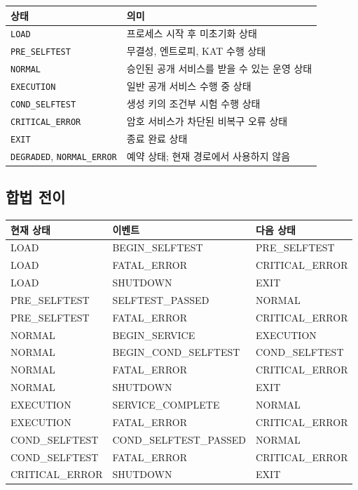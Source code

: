 \documentclass[11pt,a4paper]{article}
\begin{document}
\begin{longtable}{p{}p{}}
\toprule
상태 & 의미 \\
\midrule
\endhead
\texttt{LOAD} & 프로세스 시작 후 미초기화 상태 \\
\texttt{PRE\_SELFTEST} & 무결성, 엔트로피, KAT 수행 상태 \\
\texttt{NORMAL} & 승인된 공개 서비스를 받을 수 있는 운영 상태 \\
\texttt{EXECUTION} & 일반 공개 서비스 수행 중 상태 \\
\texttt{COND\_SELFTEST} & 생성 키의 조건부 시험 수행 상태 \\
\texttt{CRITICAL\_ERROR} & 암호 서비스가 차단된 비복구 오류 상태 \\
\texttt{EXIT} & 종료 완료 상태 \\
\texttt{DEGRADED}, \texttt{NORMAL\_ERROR} & 예약 상태; 현재 경로에서 사용하지 않음 \\
\bottomrule
\end{longtable}

\subsection{합법 전이}

\begin{longtable}{lll}
\toprule
현재 상태 & 이벤트 & 다음 상태 \\
\midrule
\endhead
LOAD & BEGIN\_SELFTEST & PRE\_SELFTEST \\
LOAD & FATAL\_ERROR & CRITICAL\_ERROR \\
LOAD & SHUTDOWN & EXIT \\
PRE\_SELFTEST & SELFTEST\_PASSED & NORMAL \\
PRE\_SELFTEST & FATAL\_ERROR & CRITICAL\_ERROR \\
NORMAL & BEGIN\_SERVICE & EXECUTION \\
NORMAL & BEGIN\_COND\_SELFTEST & COND\_SELFTEST \\
NORMAL & FATAL\_ERROR & CRITICAL\_ERROR \\
NORMAL & SHUTDOWN & EXIT \\
EXECUTION & SERVICE\_COMPLETE & NORMAL \\
EXECUTION & FATAL\_ERROR & CRITICAL\_ERROR \\
COND\_SELFTEST & COND\_SELFTEST\_PASSED & NORMAL \\
COND\_SELFTEST & FATAL\_ERROR & CRITICAL\_ERROR \\
CRITICAL\_ERROR & SHUTDOWN & EXIT \\
\bottomrule
\end{longtable}
\end{document}
